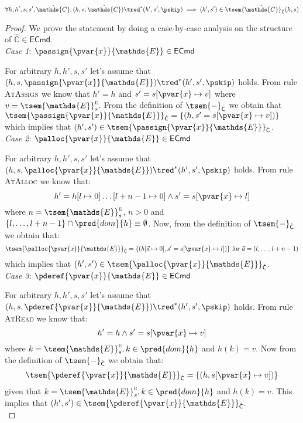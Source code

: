 \begin{lem}
	\label{lem:atomViewsE}
	\begin{gather*}
		\forall h, h', s, s', \hat{\mathds{C}} \ldotp
		(h, s, \hat{\mathds{C}}) \tred^* (h', s', \pskip)
		\implies
		(h', s') \in \tsem{\hat{\mathds{C}}}_{\hat{\mathsf{C}}}(h, s)
	\end{gather*}
	{\parindent0pt
	\begin{proof}
	We prove the statement by doing a case-by-case analysis on the structure of  $\hat{\mathds{C}} \in \mathsf{ECmd}$. \\
	
	\textit{Case 1}: $\passign{\pvar{x}}{\mathds{E}} \in \mathsf{ECmd}$
	
	For arbitrary $h, h', s, s'$ let's assume that $(h, s, \passign{\pvar{x}}{\mathds{E}}) \tred^* (h', s', \pskip)$ holds. From rule \textsc{AtAssign} we know that $h' = h$ and $s' = s[\pvar{x} \mapsto v]$ where $v = \tsem{\mathds{E}}^\textsc{e}_s$. From the definition of $\tsem{-}_{\hat{\mathsf{C}}}$ we obtain that $\tsem{\passign{\pvar{x}}{\mathds{E}}}_{\hat{\mathsf{C}}} = \{ (h, s' = s[\pvar{x} \mapsto v]) \}$ which implies that $(h', s') \in \tsem{\passign{\pvar{x}}{\mathds{E}}}_{\hat{\mathsf{C}}}$. \\
	
	\textit{Case 2}: $\palloc{\pvar{x}}{\mathds{E}} \in \mathsf{ECmd}$
	
	For arbitrary $h, h', s, s'$ let's assume that $(h, s, \palloc{\pvar{x}}{\mathds{E}}) \tred^* (h', s', \pskip)$ holds. From rule \textsc{AtAlloc} we know that:
	\[
		h' = h[l \mapsto 0]\dots[l + n - 1 \mapsto 0] \land s' = s[\pvar{x} \mapsto l]
	\]
	where $n = \tsem{\mathds{E}}^\textsc{e}_s$, $n > 0$ and $\{ l, \ldots, l + n - 1\} \cap \pred{dom}{h} \equiv \emptyset$. Now, from the definition of $\tsem{-}_{\hat{\mathsf{C}}}$ we obtain that:
	\[
		\tsem{\palloc{\pvar{x}}{\mathds{E}}}_{\hat{\mathsf{C}}} = \{ (h[\vec{a} \mapsto 0], s' = s[\pvar{x} \mapsto l]) \} \text{ for } \vec{a} = (l, \ldots, l + n - 1)
	\]
	which implies that $(h', s') \in \tsem{\palloc{\pvar{x}}{\mathds{E}}}_{\hat{\mathsf{C}}}$. \\
	
	\textit{Case 3}: $\pderef{\pvar{x}}{\mathds{E}} \in \mathsf{ECmd}$
	
	For arbitrary $h, h', s, s'$ let's assume that $(h, s, \pderef{\pvar{x}}{\mathds{E}}) \tred^* (h', s', \pskip)$ holds. From rule \textsc{AtRead} we know that:
	\[
		h' = h \land s' = s[\pvar{x} \mapsto v]
	\]
	where $k = \tsem{\mathds{E}}^\textsc{e}_s, k \in \pred{dom}{h}$ and $h(k) = v$. Now from  the definition of $\tsem{-}_{\hat{\mathsf{C}}}$ we obtain that:
	\[
		\tsem{\pderef{\pvar{x}}{\mathds{E}}}_{\hat{\mathsf{C}}} = \{ (h, s[\pvar{x} \mapsto v]) \}
	\]
	given that $k = \tsem{\mathds{E}}^\textsc{e}_s, k \in \pred{dom}{h}$ and $h(k) = v$. This implies that $(h', s') \in \tsem{\pderef{\pvar{x}}{\mathds{E}}}_{\hat{\mathsf{C}}}$. \\
	

\end{proof}}
\end{lem}
